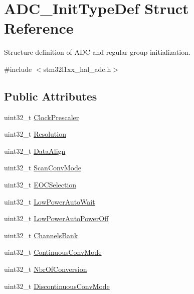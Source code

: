 \hypertarget{struct_a_d_c___init_type_def}{\section{A\-D\-C\-\_\-\-Init\-Type\-Def Struct Reference}
\label{struct_a_d_c___init_type_def}
}


Structure definition of A\-D\-C and regular group initialization.  




{\ttfamily \#include $<$stm32l1xx\-\_\-hal\-\_\-adc.\-h$>$}

\subsection*{Public Attributes}
\begin{DoxyCompactItemize}
\item 
uint32\-\_\-t \hyperlink{struct_a_d_c___init_type_def_a7e49d0db9ef7db8806bbfa57a1bd73a6}{Clock\-Prescaler}
\item 
uint32\-\_\-t \hyperlink{struct_a_d_c___init_type_def_abebb8d3277cb9a5aae72578076762f5d}{Resolution}
\item 
uint32\-\_\-t \hyperlink{struct_a_d_c___init_type_def_af9ec9040d55aa68c23d92d174b464ac1}{Data\-Align}
\item 
uint32\-\_\-t \hyperlink{struct_a_d_c___init_type_def_a47cd689a52562a2481059a5d8ed82788}{Scan\-Conv\-Mode}
\item 
uint32\-\_\-t \hyperlink{struct_a_d_c___init_type_def_ae3eedd269c3acc6c6933e8a252c36e71}{E\-O\-C\-Selection}
\item 
uint32\-\_\-t \hyperlink{struct_a_d_c___init_type_def_a6ebf4a0acd13047e0ac6316ace559d5d}{Low\-Power\-Auto\-Wait}
\item 
uint32\-\_\-t \hyperlink{struct_a_d_c___init_type_def_a34caee54ab87dbe4560dad512513fd42}{Low\-Power\-Auto\-Power\-Off}
\item 
uint32\-\_\-t \hyperlink{struct_a_d_c___init_type_def_a0309138376012c68518fb9e5e88213cb}{Channels\-Bank}
\item 
uint32\-\_\-t \hyperlink{struct_a_d_c___init_type_def_a4bf957b8be6ae85d71e9376e6f1e633b}{Continuous\-Conv\-Mode}
\item 
uint32\-\_\-t \hyperlink{struct_a_d_c___init_type_def_aa72b0cc3e8dac3a30097cf12093c42a7}{Nbr\-Of\-Conversion}
\item 
uint32\-\_\-t \hyperlink{struct_a_d_c___init_type_def_a35cc74067e2d269bb2f5e8d71c245b4b}{Discontinuous\-Conv\-Mode}

\end{DoxyCompactItemize}
